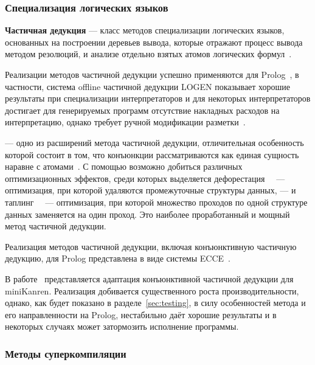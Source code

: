 \subsubsection{Специализация логических языков}

{\bf Частичная дедукция} --- класс методов специализации логических языков,
основанных на построении деревьев вывода, которые отражают процесс вывода методом
резолюций, и анализе отдельно взятых атомов логических формул~\cite{advanced}.

Реализации методов частичной дедукции успешно применяются для
Prolog~\cite{prologPE},
в частности, система offline частичной дедукции LOGEN
показывает хорошие результаты при специализации интерпретаторов и
для некоторых интерпретаторов достигает для генерируемых программ
отсутствие накладных расходов на интерпретацию,
однако требует ручной модификации разметки~\cite{offlinePD}.

\Cpd --- одно из расширений метода частичной дедукции, отличительная
особенность которой состоит в том, что конъюнкции рассматриваются как
единая сущность наравне с атомами~\cite{cpd}. С помощью \forcpd
возможно добиться различных оптимизационных эффектов, среди которых
выделяется дефорестация~~\cite{deforest}
--- оптимизация, при которой удаляются промежуточные структуры данных, ---
и таплинг~~\cite{tupling}
--- оптимизация, при которой множество проходов по одной структуре данных заменяется на один проход.
Это наиболее проработанный и мощный метод частичной дедукции.


Реализация методов частичной дедукции, включая конъюнктивную частичную дедукцию, для Prolog
представлена в виде системы ECCE~\cite{ecce}.

В работе~\cite{lozov} представляется адаптация конъюнктивной частичной дедукции для miniKanren.
Реализация добивается существенного роста производительности, однако,
как будет показано в разделе~\ref{sec:testing}, в силу особенностей метода и его
направленности на Prolog, нестабильно даёт хорошие результаты и
в некоторых случаях может затормозить исполнение программы.

\subsubsection{Методы суперкомпиляции}

